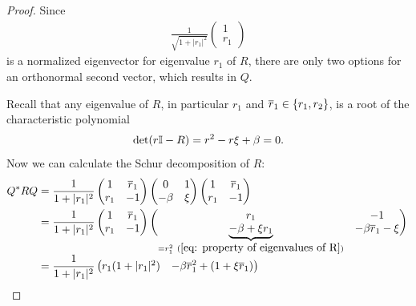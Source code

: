 \begin{proof}
	Since
	\begin{align*}
		\frac{1}{\sqrt{1+|r_1|^2}} \begin{pmatrix}
			1 \\
			r_1
		\end{pmatrix}
	\end{align*}
	is a normalized eigenvector for eigenvalue \(r_1\) of \(R\), there are
	only two options for an orthonormal second vector, which results in \(Q\).

	Recall that any eigenvalue of \(R\), in particular \(r_1\) and
	\(\overline{r}_1\in\{r_1, r_2\}\), is a root of the characteristic polynomial
	\begin{align}\label{eq: property of eigenvalues of R}
		\det (r\mathbb{I} - R) = r^2 - r\xi + \beta = 0.
	\end{align}
	Now we can calculate the Schur decomposition of \(R\):
	\begin{align*}
		Q^* R Q
		&= \frac{1}{1+|r_1|^2} \begin{pmatrix}
			1 & \conjugate{r}_1 \\
			r_{1} & -1
		\end{pmatrix}
		\begin{pmatrix}
			0 & 1 \\
			-\momCoeff & \xi
		\end{pmatrix}
		\begin{pmatrix}
			1 & \conjugate{r}_1 \\
			r_1 & -1
		\end{pmatrix}\\
		&= \frac{1}{1+|r_{1}|^2} \begin{pmatrix}
			1 & \conjugate{r}_1 \\
			r_1 & -1
		\end{pmatrix}
		\begin{pmatrix}
			r_1 & -1 \\
			\smash{\underbrace{-\momCoeff + \xi r_1}_{
				=r_1^2 \ (\ref{eq: property of eigenvalues of R})
			}}
			& -\momCoeff \conjugate{r}_1 - \xi
		\end{pmatrix}
		\vphantom{\underbrace{\begin{pmatrix}1\\1\end{pmatrix}}_{=2}}
		\\
		&=\frac{1}{1+|r_{1}|^2}\begin{pmatrix}
			r_1(1+|r_1|^2)
			& -\momCoeff \conjugate{r}_1^2  + (1+\xi \conjugate{r}_1) \\

\end{pmatrix}
\end{align*}
\end{proof}
